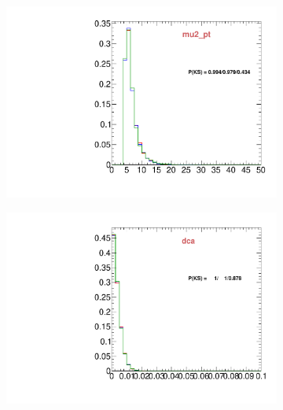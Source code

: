 \begin{figure}
\begin{subfigure}[b]{0.2\textwidth}
                \includegraphics[width=\textwidth]{Figures/VariablesComparison/MC_barrel_figs_3h/mu2_pt}
                \label{fig:MC_barrel_mu2_pt_3h}
        \end{subfigure}
        \begin{subfigure}[b]{0.2\textwidth}
                \centering
                \includegraphics[width=\textwidth]{Figures/VariablesComparison/MC_barrel_figs_3h/dca}
                \label{fig:MC_barrel_dca_3h}
        \end{subfigure}
        \begin{subfigure}[b]{0.2\textwidth}
                \centering

\end{subfigure}
\end{figure}
